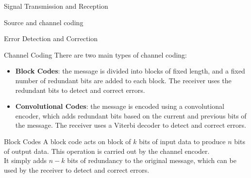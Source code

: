 \begin{section}{Signal Transmission and Reception}
\begin{section}{Source and channel coding}
\begin{subsection}{Error Detection and Correction}
\begin{subsubsection}{Channel Coding}
        There are two main types of channel coding:
        \begin{itemize}
          \item \textbf{Block Codes}: the message is divided into blocks of fixed length, and a 
            fixed number of redundant bits are added to each block. The receiver uses the redundant
            bits to detect and correct errors.
          \item \textbf{Convolutional Codes}: the message is encoded using a convolutional encoder,
            which adds redundant bits based on the current and previous bits of the message. The 
            receiver uses a Viterbi decoder to detect and correct errors.
        \end{itemize}
      \end{subsubsection}
      \begin{subsubsection}{Block Codes}
        A block code acts on block of $k$ bits of input data to produce $n$ bits of output data.
        This operation is carried out by the channel encoder.\\
        It simply adds $n-k$ bits of redundancy to the original message, which can be used by the
        receiver to detect and correct errors.\\


\end{subsubsection}
\end{subsection}
\end{section}
\end{section}
